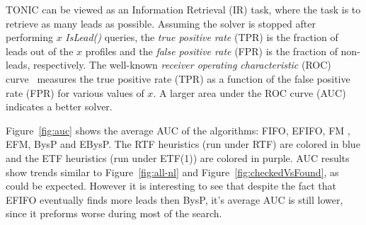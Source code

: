 \documentclass[prodmode,acmtecs]{acmsmall} %
\newcommand{\islead}[1]{{\em IsLead(#1)}}
\begin{document}
TONIC can be viewed as an Information Retrieval (IR) task, where the task is to retrieve as many leads as possible. %
Assuming the solver is stopped after performing $x$ \islead{} queries, the {\em true positive rate} (TPR) is the fraction of leads out of the \(x\) profiles and the {\em false positive rate} (FPR) is the fraction of non-leads, respectively. 
The well-known {\em receiver operating characteristic} (ROC) curve~\cite{croft2010search} measures the true positive rate (TPR) as a function of the false positive rate (FPR) for various values of \(x\). A larger area under the ROC curve (AUC) indicates a better solver. 

Figure~\ref{fig:auc} shows the average AUC of the algorithms: FIFO, EFIFO, FM , EFM, BysP and EBysP. The RTF heuristics (run under RTF)  are colored in blue and the ETF heuristics (run under ETF(1)) are colored in purple. AUC results show trends similar to Figure~\ref{fig:all-nl} and Figure~\ref{fig:checkedVsFound}, as could be expected. However it is interesting to see that despite the fact that EFIFO eventually finds more leads then BysP, it's average AUC is still lower, since it preforms worse during most of the search.



\end{document}
